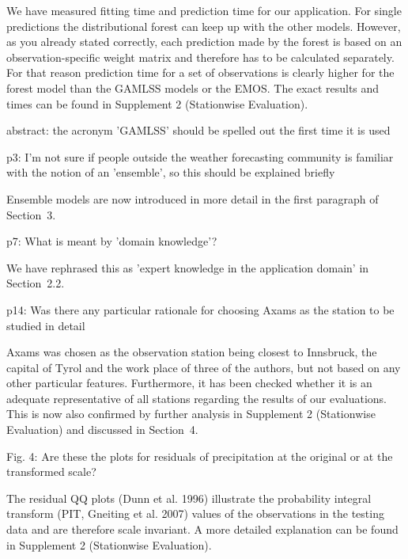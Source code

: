 \documentclass[american,foldmarks=false,noconfig]{uibklttr}
\newenvironment{review}{\fontshape{\itdefault}\fontseries{\bfdefault} \selectfont \smallskip}{\par}
\begin{document}
We have measured fitting time and prediction time for our 
application. For single predictions the distributional forest 
can keep up with the other models. However, as you already 
stated correctly, each prediction made by the forest is based 
on an observation-specific weight matrix and therefore has to 
be calculated separately. For that reason prediction time for a 
set of observations is clearly higher for the forest model than 
the GAMLSS models or the EMOS. The exact results and times can 
be found in Supplement 2 (Stationwise Evaluation).


\begin{review}
abstract: the acronym 'GAMLSS' should be spelled out the first 
time it is used
\end{review}

\begin{review}
p3: I'm not sure if people outside the weather forecasting 
community is familiar with the notion of an 'ensemble', so 
this should be explained briefly
\end{review}

Ensemble models are now introduced in more detail in the
first paragraph of Section~3.


\begin{review}
p7: What is meant by 'domain knowledge'?
\end{review}

We have rephrased this as 'expert knowledge in the application domain'
in Section~2.2.


\begin{review}
p14: Was there any particular rationale for choosing Axams 
as the station to be studied in detail
\end{review}

Axams was chosen as the observation station being closest 
to Innsbruck, the capital of Tyrol and the work place of 
three of the authors, but not based on any other particular 
features. Furthermore, it has been checked whether it 
is an adequate representative of all stations regarding 
the results of our evaluations. This is now also 
confirmed by further analysis in Supplement 2 (Stationwise Evaluation) 
and discussed in Section~4.

\begin{review}
Fig. 4: Are these the plots for residuals of precipitation 
at the original or at the transformed scale?
\end{review}

The residual QQ plots (Dunn et al. 1996) illustrate the probability 
integral transform (PIT, Gneiting et al. 2007) values of the observations 
in the testing data and are therefore scale invariant. A more detailed 
explanation can be found in Supplement 2 (Stationwise Evaluation).
\end{document}
